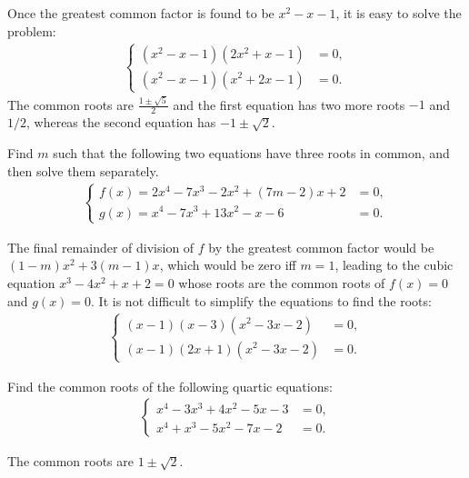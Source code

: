 \documentclass[12pt,a4paper]{memoir}
\theoremstyle{definition}
\begin{document}
\begin{solution}
	Once the greatest common factor is found to be $x^2-x-1$,  it is easy to solve the problem:
	\begin{align*}
		\begin{cases}
			(x^2-x-1)(2x^2+x-1)&=0,\\(x^2-x-1)(x^2+2x-1)&=0.
		\end{cases}
	\end{align*}
	The common roots are $\frac{1\pm\sqrt{5}}{2}$ and the first equation has two more roots $-1$ and $1/2$, whereas the second equation has $-1\pm\sqrt{2}$. 
\end{solution}


\begin{question}
	Find $m$ such that the following two equations have three roots in common, and then solve them separately.
	\begin{align*}
		\begin{cases}
			f(x)=2x^4-7x^3-2x^2+(7m-2)x+2&=0,\\g(x)=x^4-7x^3+13x^2-x-6&=0.
		\end{cases}
	\end{align*}
\end{question}

\begin{solution}
	The final remainder of division of $f$ by the greatest common factor would be $(1-m)x^2+3(m-1)x$, which would be zero iff $m=1$, leading to the cubic equation $x^3-4x^2+x+2=0$ whose roots are the common roots of $f(x)=0$ and $g(x)=0$. It is not difficult to simplify the equations to find the roots:
	\begin{align*}
		\begin{cases}
			(x-1)(x-3)(x^2-3x-2)&=0,\\(x-1)(2x+1)(x^2-3x-2)&=0.
		\end{cases}
	\end{align*}
\end{solution}


\begin{question}
	Find the common roots of the following quartic equations:
	\begin{align*}
		\begin{cases}
			x^4-3x^3+4x^2-5x-3 &=0,\\x^4+x^3-5x^2-7x-2 &=0.
		\end{cases}
	\end{align*}
\end{question}

\begin{solution}
	The common roots are $1 \pm \sqrt{2}$.
\end{solution}
\end{document}
